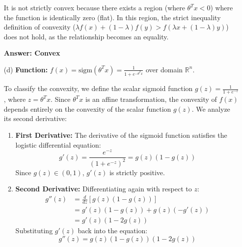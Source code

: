 \documentclass[12pt]{article}
\begin{document}
\begin{enumerate}
    It is not strictly convex because there exists a region (where $\theta^T x < 0$) where the function is identically zero (flat). In this region, the strict inequality definition of convexity ($\lambda f(x) + (1-\lambda)f(y) > f(\lambda x + (1-\lambda)y)$) does not hold, as the relationship becomes an equality.
    
    \textbf{Answer: Convex}

    
    

    \item[(d)] \textbf{Function:} $f(x) = \text{sigm}(\theta^T x) = \frac{1}{1+e^{-\theta^T x}}$ over domain $\mathbb{R}^n$.
    
    To classify the convexity, we define the scalar sigmoid function $g(z) = \frac{1}{1+e^{-z}}$, where $z = \theta^T x$. Since $\theta^T x$ is an affine transformation, the convexity of $f(x)$ depends entirely on the convexity of the scalar function $g(z)$. We analyze its second derivative:
    
    \begin{enumerate}
        \item \textbf{First Derivative:}
        The derivative of the sigmoid function satisfies the logistic differential equation:
        $$ g'(z) = \frac{e^{-z}}{(1+e^{-z})^2} = g(z)(1 - g(z)) $$
        Since $g(z) \in (0, 1)$, $g'(z)$ is strictly positive.
        
        \item \textbf{Second Derivative:}
        Differentiating again with respect to $z$:
        \begin{align*}
            g''(z) &= \frac{d}{dz} [g(z)(1 - g(z))] \\
                   &= g'(z)(1 - g(z)) + g(z)(-g'(z)) \\
                   &= g'(z)(1 - 2g(z))
        \end{align*}
        Substituting $g'(z)$ back into the equation:
        $$ g''(z) = g(z)(1 - g(z))(1 - 2g(z)) $$
    \end{enumerate}


\end{enumerate}
\end{document}
